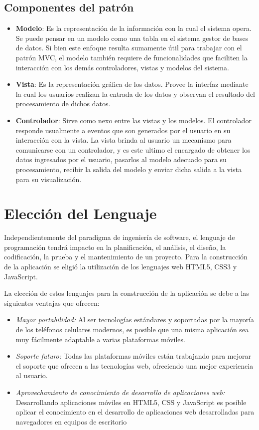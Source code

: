 \subsection{Componentes del patrón}
\begin{itemize}
    \item \textbf{Modelo}: Es la representación de la información con la cual el sistema opera. Se
    puede pensar en un modelo como una tabla en el sistema gestor de bases de datos.
    Si bien este enfoque resulta sumamente útil para trabajar con el patrón MVC,
    el modelo también requiere de funcionalidades que faciliten la interacción con los
    demás controladores, vistas y modelos del sistema.
    \item \textbf{Vista}: Es la representación gráfica de los datos. Provee la interfaz mediante la cual
    los usuarios realizan la entrada de los datos y observan el resultado del procesamiento
    de dichos datos.
    \item \textbf{Controlador}: Sirve como nexo entre las vistas y los modelos. El controlador responde
    usualmente a eventos que son generados por el usuario en su interacción con
    la vista. La vista brinda al usuario un mecanismo para comunicarse con un controlador,
    y es este ultimo el encargado de obtener los datos ingresados por el usuario,
    pasarlos al modelo adecuado para su procesamiento, recibir la salida del modelo y
    enviar dicha salida a la vista para su visualización.
    
\end{itemize}



\section{Elección del Lenguaje}

    Independientemente del paradigma de ingeniería de software, el lenguaje de programación tendrá impacto en la planificación, el análisis, el diseño, la codificación, la prueba y el mantenimiento de un proyecto. Para la construcción de la aplicación se eligió la utilización de los lenguajes web \gls{HTML}5, \gls{CSS}3 y \gls{JavaScript}.

    La elección de estos lenguajes para la construcción de la aplicación se debe a las siguientes ventajas que ofrecen:
    \begin{itemize}
        \item \emph{Mayor portabilidad:} Al ser tecnologías estándares y soportadas por la mayoría de los teléfonos celulares modernos, es posible que una misma aplicación sea muy fácilmente adaptable a varias plataformas móviles.
        \item \emph{Soporte futuro:} Todas las plataformas móviles están trabajando para mejorar el soporte que ofrecen a las tecnologías web, ofreciendo una mejor experiencia al usuario.
        \item \emph{Aprovechamiento de conocimiento de desarrollo de aplicaciones web:} Desarrollando aplicaciones móviles en HTML5, CSS y JavaScript es posible aplicar el conocimiento en el desarrollo de aplicaciones web desarrolladas para navegadores en equipos de escritorio 
    \end{itemize}

